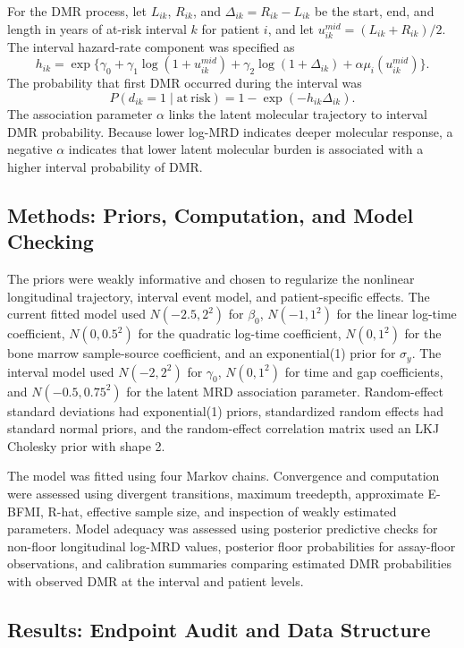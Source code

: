 For the DMR process, let \(L_{ik}\), \(R_{ik}\), and \(\Delta_{ik}=R_{ik}-L_{ik}\) be the start, end, and length in years of at-risk interval \(k\) for patient \(i\), and let \(u_{ik}^{mid}=(L_{ik}+R_{ik})/2\). The interval hazard-rate component was specified as
\[
h_{ik} =
\exp\{\gamma_0 + \gamma_1\log(1+u_{ik}^{mid})
+\gamma_2\log(1+\Delta_{ik})
+\alpha\mu_i(u_{ik}^{mid})\}.
\]
The probability that first DMR occurred during the interval was
\[
P(d_{ik}=1\mid \mathrm{at\ risk}) =
1-\exp(-h_{ik}\Delta_{ik}).
\]
The association parameter \(\alpha\) links the latent molecular trajectory to interval DMR probability. Because lower log-MRD indicates deeper molecular response, a negative \(\alpha\) indicates that lower latent molecular burden is associated with a higher interval probability of DMR.

\subsection*{Methods: Priors, Computation, and Model Checking}

The priors were weakly informative and chosen to regularize the nonlinear longitudinal trajectory, interval event model, and patient-specific effects. The current fitted model used \(N(-2.5,2^2)\) for \(\beta_0\), \(N(-1,1^2)\) for the linear log-time coefficient, \(N(0,0.5^2)\) for the quadratic log-time coefficient, \(N(0,1^2)\) for the bone marrow sample-source coefficient, and an exponential(1) prior for \(\sigma_y\). The interval model used \(N(-2,2^2)\) for \(\gamma_0\), \(N(0,1^2)\) for time and gap coefficients, and \(N(-0.5,0.75^2)\) for the latent MRD association parameter. Random-effect standard deviations had exponential(1) priors, standardized random effects had standard normal priors, and the random-effect correlation matrix used an LKJ Cholesky prior with shape 2.

The model was fitted using four Markov chains. Convergence and computation were assessed using divergent transitions, maximum treedepth, approximate E-BFMI, R-hat, effective sample size, and inspection of weakly estimated parameters. Model adequacy was assessed using posterior predictive checks for non-floor longitudinal log-MRD values, posterior floor probabilities for assay-floor observations, and calibration summaries comparing estimated DMR probabilities with observed DMR at the interval and patient levels.

\subsection*{Results: Endpoint Audit and Data Structure}

